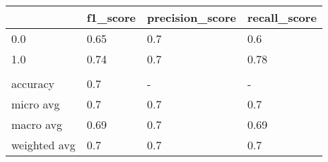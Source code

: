 \begin{tabular}{llll}
\toprule
{} & f1\_score & precision\_score & recall\_score \\
\midrule
0.0          &     0.65 &             0.7 &          0.6 \\
1.0          &     0.74 &             0.7 &         0.78 \\
             &          &                 &              \\
accuracy     &      0.7 &               - &            - \\
micro avg    &      0.7 &             0.7 &          0.7 \\
macro avg    &     0.69 &             0.7 &         0.69 \\
weighted avg &      0.7 &             0.7 &          0.7 \\
\bottomrule
\end{tabular}
